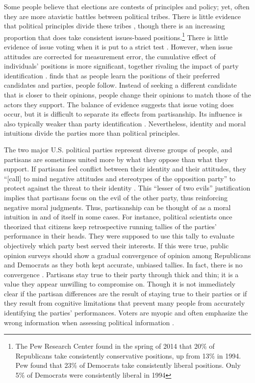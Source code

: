 Some people believe that elections are contests of principles and policy; yet, often they are more atavistic battles between political tribes. There is little evidence that political principles divide these tribes \cite{DiMaggioetal1996,FiorinaAbramsPope2005,FiorinaAbrams2008}, though there is an increasing proportion that does take consistent issues-based positions.\footnote{The Pew Research Center found in the spring of 2014 that 20\% of Republicans take consistently conservative positions, up from 13\% in 1994. Pew found that 23\% of Democrats take consistently liberal positions. Only 5\% of Democrats were consistently liberal in 1994 } There is little evidence of issue voting when it is put to a strict test \cite{MeierCampbell1979}. However, when issue attitudes are corrected for measurement error, the cumulative effect of individuals' positions is more significant, together rivaling the impact of party identification \cite{Ansolabehereetal2008}.  finds that as people learn the positions of their preferred candidates and parties, people follow. Instead of seeking a different candidate that is closer to their opinions, people change their opinions to match those of the actors they support. The balance of evidence suggests that issue voting does occur, but it is difficult to separate its effects from partisanship. Its influence is also typically weaker than party identification \cite{Jacoby2010,LewisBecketal2008}. Nevertheless, identity \cite{Levendusky2009a,Mason2013,MasonForthcoming} and moral intuitions \cite{Haidt2012} divide the parties more than political principles.

The two major U.S. political parties represent diverse groups of people, and partisans are sometimes united more by what they oppose than what they support. If partisans feel conflict between their identity and their attitudes, they ``[call] to mind negative attitudes and stereotypes of the opposition party'' to protect against the threat to their identity \cite[464]{Groenendyk2012}. This ``lesser of two evils'' justification implies that partisans focus on the evil of the other party, thus reinforcing negative moral judgments. Thus, partisanship can be thought of as a moral intuition in and of itself in some cases. For instance, political scientists once theorized that citizens keep retrospective running tallies of the parties' performance in their heads. They were supposed to use this tally to evaluate objectively which party best served their interests. If this were true, public opinion surveys should show a gradual convergence of opinion among Republicans and Democrats as they both kept accurate, unbiased tallies. In fact, there is no convergence \cite{Bartels2002b}. Partisans stay true to their party through thick and thin; it is a value they appear unwilling to compromise on. Though it is not immediately clear if the partisan differences are the result of staying true to their parties or if they result from cognitive limitations that prevent many people from accurately identifying the parties' performances. Voters are myopic and often emphasize the wrong information when assessing political information \cite{Bartels2008}.

